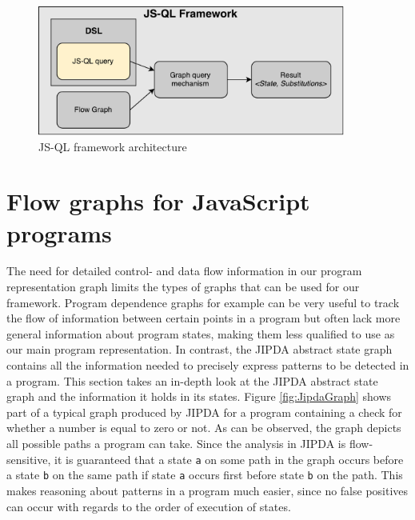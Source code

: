 \begin{figure}
    \centering
      \includegraphics[width=0.9\textwidth]{images/Architecture} 
      \caption{JS-QL framework architecture}
    \label{fig:architecture}
\end{figure}
\section{Flow graphs for JavaScript programs}

The need for detailed control- and data flow information in our program representation graph limits the types of graphs that can be used for our framework. Program dependence graphs\cite{PDG} for example can be very useful to track the flow of information between certain points in a program but often lack more general information about program states, making them less qualified to use as our main program representation. In contrast, the JIPDA\cite{} abstract state graph contains all the information needed to precisely express patterns to be detected in a program. This section takes an in-depth look at the JIPDA abstract state graph and the information it holds in its states. Figure \ref{fig:JipdaGraph} shows part of a typical graph produced by JIPDA for a program containing a check for whether a number is equal to zero or not.
As can be observed, the graph depicts all possible paths a program can take. Since the analysis in JIPDA is flow-sensitive, it is guaranteed that a state \texttt{a} on some path in the graph occurs before a state \texttt{b} on the same path if state \texttt{a} occurs first before state \texttt{b} on the path. This makes reasoning about patterns in a program much easier, since no false positives can occur with regards to the order of execution of states. 






